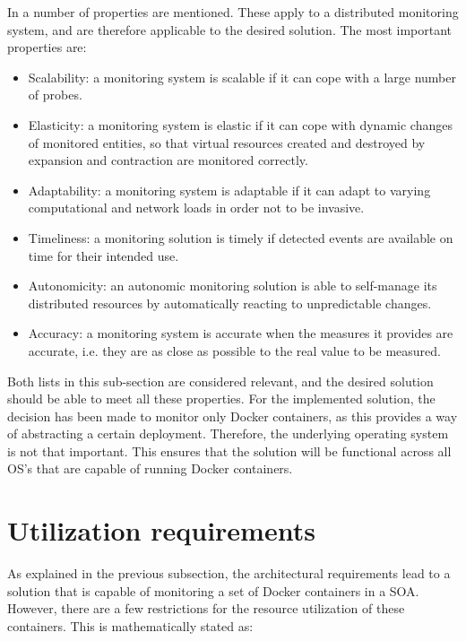 \noindent
In \cite{aceto2013cloud} a number of properties are mentioned. These apply to a distributed monitoring system, and are therefore applicable to the desired solution. The most important properties are:
\begin{itemize}
    \item Scalability: a monitoring system is scalable if it can cope with a large number of probes.
    \item Elasticity: a monitoring system is elastic if it can cope with dynamic changes of monitored entities, so that virtual resources created and destroyed by expansion and contraction are monitored correctly.
    \item Adaptability: a monitoring system is adaptable if it can adapt to varying computational and network loads in order not to be invasive.
    \item Timeliness: a monitoring solution is timely if detected events are available on time for their intended use.
    \item Autonomicity: an autonomic monitoring solution is able to self-manage its distributed resources by automatically reacting to unpredictable changes.
    \item Accuracy: a monitoring system is accurate when the measures it provides are accurate, i.e. they are as close as possible to the real value to be measured.
\end{itemize}

\noindent
Both lists in this sub-section are considered relevant, and the desired solution should be able to meet all these properties. For the implemented solution, the decision has been made to monitor only Docker containers, as this provides a way of abstracting a certain deployment. Therefore, the underlying operating system is not that important. This ensures that the solution will be functional across all OS's that are capable of running Docker containers. 

\section{Utilization requirements} \label{sec:utilization}
As explained in the previous subsection, the architectural requirements lead to a solution that is capable of monitoring a set of Docker containers in a SOA. However, there are a few restrictions for the resource utilization of these containers. This is mathematically stated as:

